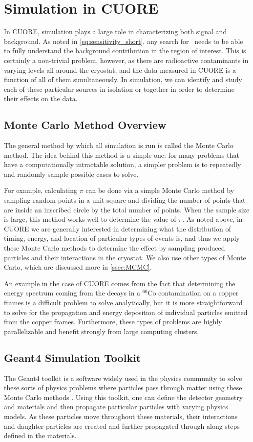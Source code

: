 \chapter{Simulation in CUORE}

In CUORE, simulation plays a large role in characterizing both signal and background.
As noted in \autoref{eq:sensitivity_short}, any search for \zeronubb~needs to be able to fully understand the background contribution in the region of interest.
This is certainly a non-trivial problem, however, as there are radioactive contaminants in varying levels all around the cryostat, and the data measured in CUORE is a function of all of them simultaneously.
In simulation, we can identify and study each of these particular sources in isolation or together in order to determine their effects on the data.
\section{Monte Carlo Method Overview}
The general method by which all simulation is run is called the Monte Carlo method.
The idea behind this method is a simple one: for many problems that have a computationally intractable solution, a simpler problem is to repeatedly and randomly sample possible cases to solve.

For example, calculating $\pi$ can be done via a simple Monte Carlo method by sampling random points in a unit square and dividing the number of points that are inside an inscribed circle by the total number of points.
When the sample size is large, this method works well to determine the value of $\pi$.
As noted above, in CUORE we are generally interested in determining what the distribution of timing, energy, and location of particular types of events is, and thus we apply these Monte Carlo methods to determine the effect by sampling produced particles and their interactions in the cryostat.
We also use other types of Monte Carlo, which are discussed more in \autoref{ssec:MCMC}.

An example in the case of CUORE comes from the fact that determining the energy spectrum coming from the decays in a $^{60}\textrm{Co}$ contamination on a copper frames is a difficult problem to solve analytically, but it is more straightforward to solve for the propagation and energy deposition of individual particles emitted from the copper frames.
Furthermore, these types of problems are highly parallelizable and benefit strongly from large computing clusters.

\section{Geant4 Simulation Toolkit}
The Geant4 toolkit is a software widely used in the physics community to solve these sorts of physics problems where particles pass through matter using these Monte Carlo methods \cite{AGOSTINELLI2003250, 528223, ALLISON2016186}.
Using this toolkit, one can define the detector geometry and materials and then propagate particular particles with varying physics models.
As these particles move throughout these materials, their interactions and daughter particles are created and further propagated through along steps defined in the materials.

